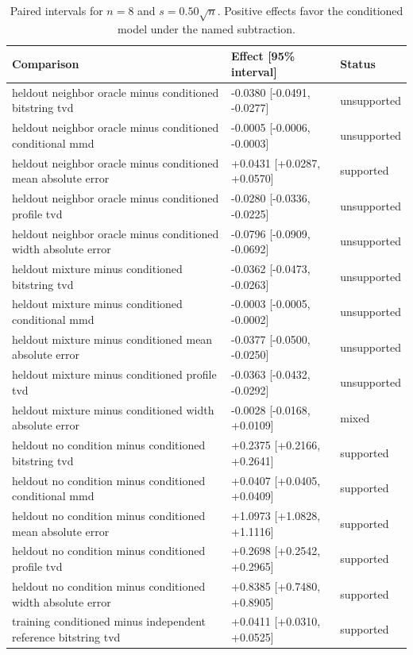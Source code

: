 \begin{table}[p]
\centering
\scriptsize
\setlength{\tabcolsep}{4pt}
\caption{Paired intervals for $n=8$ and $s=0.50\sqrt n$. Positive effects favor the conditioned model under the named subtraction.}
\label{tab:all-intervals-n8-w0.50}
\begin{tabular}{@{}p{}p{}p{}@{}}
\toprule
Comparison & Effect [95\% interval] & Status\\
\midrule
heldout neighbor oracle minus conditioned bitstring tvd & -0.0380 [-0.0491, -0.0277] & unsupported \\
heldout neighbor oracle minus conditioned conditional mmd & -0.0005 [-0.0006, -0.0003] & unsupported \\
heldout neighbor oracle minus conditioned mean absolute error & +0.0431 [+0.0287, +0.0570] & supported \\
heldout neighbor oracle minus conditioned profile tvd & -0.0280 [-0.0336, -0.0225] & unsupported \\
heldout neighbor oracle minus conditioned width absolute error & -0.0796 [-0.0909, -0.0692] & unsupported \\
heldout mixture minus conditioned bitstring tvd & -0.0362 [-0.0473, -0.0263] & unsupported \\
heldout mixture minus conditioned conditional mmd & -0.0003 [-0.0005, -0.0002] & unsupported \\
heldout mixture minus conditioned mean absolute error & -0.0377 [-0.0500, -0.0250] & unsupported \\
heldout mixture minus conditioned profile tvd & -0.0363 [-0.0432, -0.0292] & unsupported \\
heldout mixture minus conditioned width absolute error & -0.0028 [-0.0168, +0.0109] & mixed \\
heldout no condition minus conditioned bitstring tvd & +0.2375 [+0.2166, +0.2641] & supported \\
heldout no condition minus conditioned conditional mmd & +0.0407 [+0.0405, +0.0409] & supported \\
heldout no condition minus conditioned mean absolute error & +1.0973 [+1.0828, +1.1116] & supported \\
heldout no condition minus conditioned profile tvd & +0.2698 [+0.2542, +0.2965] & supported \\
heldout no condition minus conditioned width absolute error & +0.8385 [+0.7480, +0.8905] & supported \\
training conditioned minus independent reference bitstring tvd & +0.0411 [+0.0310, +0.0525] & supported \\

\end{tabular}
\end{table}
